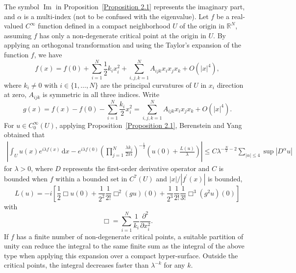 \documentclass[12pt]{article}
\numberwithin{equation}{section}
\numberwithin{equation}{section}
\begin{document}
The symbol $\operatorname{Im}$ in Proposition~\ref{Proposition 2.1} represents the imaginary part, and $\alpha$ is a multi-index (not to be confused with the eigenvalue). Let $f$ be a real-valued $C^{\infty}$ function defined in a compact neighborhood $U$ of the origin in $\mathbb{R}^{N}$, assuming $f$ has only a non-degenerate critical point at the origin in $U$. By applying an orthogonal transformation and using the Taylor's expansion of the function $f$, we have
\begin{equation*}
f(x)=f(0)+\sum_{i=1}^{N} \frac{1}{2} k_{i} x_{i}^{2}+\sum_{i,j,k=1}^{N} A_{i j k} x_{i} x_{j} x_{k}+O\left(|x|^{4}\right),
\end{equation*}
where $k_{i}\neq0$ with $i\in\{1,\ldots,N\}$ are the principal curvatures of $U$ in $x_{i}$ direction at zero, $A_{i j k}$ is symmetric in all three indices.
Write
\begin{equation*}
g(x)=f(x)-f(0)-\sum_{i=1}^{N} \frac{k_{i}}{2} x_{i}^{2}=\sum_{i,j,k=1}^{N} A_{i j k} x_{i} x_{j} x_{k}+O\left(|x|^{4}\right).
\end{equation*}
For $u\in C_{0}^{\infty}(U)$, applying Proposition~\ref{Proposition 2.1}, Berenstein and Yang \cite{Berenstein2} obtained that
\begin{equation}\label{Hormander}
\begin{array}{c}
\left|\int_U u(x) e^{i \lambda f(x)}\, \text{d}x-e^{i \lambda f(0)}\left(\prod\limits_{j=1}^{N} \frac{\lambda k_{j}}{2 \pi i}\right)^{-\frac{1}{2}}\left(u(0)+\frac{L(u)}{\lambda}\right)\right|
\leq C \lambda^{-\frac{N}{2}-2} \sum\limits_{|\alpha| \leq 4} \sup \left|D^{\alpha} u\right|
\end{array}
\end{equation}
for $\lambda>0$, where $D$ represents the first-order derivative operator and $C$ is bounded when $f$ within a bounded set in $C^{7}(U)$ and $|x|/\left|f^{\prime}(x)\right|$ is bounded,
\begin{equation*}
L(u)=-i\left[\frac{1}{2} \Box u(0)+\frac{1}{2^{2}}\frac{1}{ 2 !} \Box^{2}(g u)(0)+\frac{1}{2^{3}} \frac{1}{2 !} \frac{1}{3 !} \Box^{3}\left(g^{2} u\right)(0)\right]
\end{equation*}
with
\begin{equation*}
\Box=\sum_{i=1}^{N} \frac{1}{k_{i}} \frac{\partial^{2}}{\partial x_{i}^{2}}.
\end{equation*}
If $f$ has a finite number of non-degenerate critical points, a suitable partition of unity can reduce the integral to the same finite sum as the integral of the above type when applying this expansion over a compact hyper-surface. Outside the critical points, the integral decreases faster than $\lambda^{-k}$ for any $k$.
\end{document}
